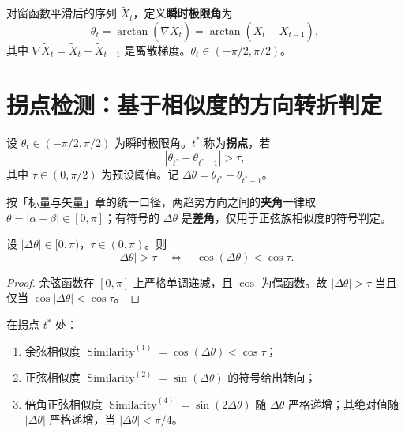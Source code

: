 \begin{definition}[时序的瞬时极限角]\label{def:ts_limit_angle}
对窗函数平滑后的序列 $\tilde{X}_t$，定义\textbf{瞬时极限角}为
\[
\theta_t = \arctan(\nabla \tilde{X}_t) = \arctan(\tilde{X}_t - \tilde{X}_{t-1}),
\]
其中 $\nabla \tilde{X}_t = \tilde{X}_t - \tilde{X}_{t-1}$ 是离散梯度。$\theta_t \in (-\pi/2, \pi/2)$。
\end{definition}

\section{拐点检测：基于相似度的方向转折判定}

\begin{definition}[拐点的数学定义]\label{def:ts_turning_point}
设 $\theta_t \in (-\pi/2, \pi/2)$ 为瞬时极限角。$t^*$ 称为\textbf{拐点}，若
\[
|\theta_{t^*} - \theta_{t^*-1}| > \tau,
\]
其中 $\tau \in (0, \pi/2)$ 为预设阈值。记 $\Delta\theta = \theta_{t^*} - \theta_{t^*-1}$。

按「标量与矢量」章的统一口径，两趋势方向之间的\textbf{夹角}一律取 $\theta=\lvert\alpha-\beta\rvert\in[0,\pi]$；有符号的 $\Delta\theta$ 是\textbf{差角}，仅用于正弦族相似度的符号判定。
\end{definition}

\begin{lemma}[拐点阈值与余弦相似度的等价性]\label{lem:ts_turning_equivalence}
设 $|\Delta\theta| \in [0, \pi)$，$\tau \in (0, \pi)$。则
\[
|\Delta\theta| > \tau \quad \Longleftrightarrow \quad \cos(\Delta\theta) < \cos\tau.
\]
\end{lemma}

\begin{proof}
余弦函数在 $[0, \pi]$ 上严格单调递减，且 $\cos$ 为偶函数。故 $|\Delta\theta| > \tau$ 当且仅当 $\cos|\Delta\theta| < \cos\tau$。
\end{proof}

\begin{proposition}[拐点的相似度特征]\label{prop:ts_turning_similarity}
在拐点 $t^*$ 处：
\begin{enumerate}[label=(\roman*)]
    \item 余弦相似度 $\operatorname{Similarity}^{(1)} = \cos(\Delta\theta) < \cos\tau$；
    \item 正弦相似度 $\operatorname{Similarity}^{(2)} = \sin(\Delta\theta)$ 的符号给出转向；
    \item 倍角正弦相似度 $\operatorname{Similarity}^{(4)} = \sin(2\Delta\theta)$ 随 $\Delta\theta$ 严格递增；其绝对值随 $|\Delta\theta|$ 严格递增，当 $|\Delta\theta| < \pi/4$。
\end{enumerate}
\end{proposition}

